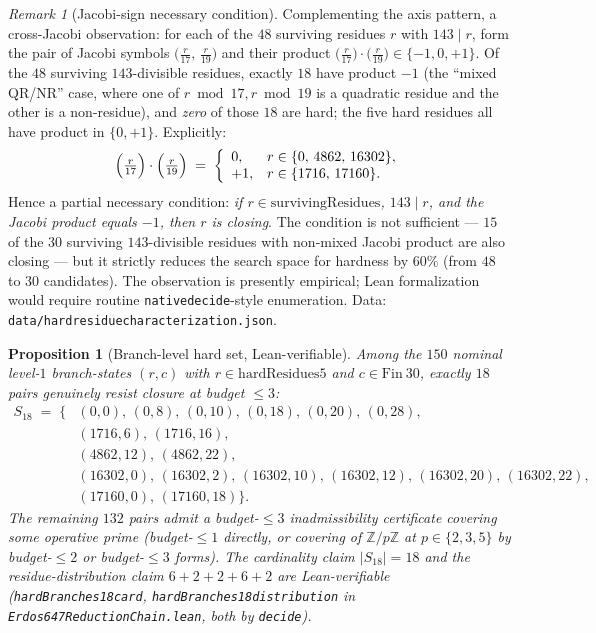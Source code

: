 \documentclass[11pt]{article}
\renewcommand{\_}{\origunderscore\allowbreak}
\newtheorem{proposition}[theorem]{Proposition}
\theoremstyle{definition}
\theoremstyle{remark}
\newtheorem{remark}[theorem]{Remark}
\begin{document}
\begin{remark}[Jacobi-sign necessary condition]\label{rmk:jacobi}
Complementing the axis pattern, a cross-Jacobi observation:
for each of the $48$ surviving residues $r$ with $143\mid r$,
form the pair of Jacobi symbols
$\bigl(\tfrac{r}{17},\,\tfrac{r}{19}\bigr)$ and their product
$\bigl(\tfrac{r}{17}\bigr)\cdot\bigl(\tfrac{r}{19}\bigr)\in\{-1,0,+1\}$.
Of the $48$ surviving $143$-divisible residues, exactly $18$ have
product $-1$ (the ``mixed QR/NR'' case, where one of
$r\bmod 17, r\bmod 19$ is a quadratic residue and the other is a
non-residue), and \emph{zero} of those $18$ are hard; the five hard
residues all have product in $\{0, +1\}$. Explicitly:
\[
\Bigl(\tfrac{r}{17}\Bigr)\cdot\Bigl(\tfrac{r}{19}\Bigr)
\;=\;\left\{
\begin{array}{ll}
0,     & r\in\{0,\,4862,\,16302\},\\
+1,    & r\in\{1716,\,17160\}.
\end{array}
\right.
\]
Hence a partial necessary condition: \emph{if
$r\in\mathrm{survivingResidues}$, $143\mid r$, and the Jacobi
product equals $-1$, then $r$ is closing}. The condition is not
sufficient — $15$ of the $30$ surviving $143$-divisible residues
with non-mixed Jacobi product are also closing — but it strictly
reduces the search space for hardness by $60\%$ (from $48$ to $30$
candidates). The observation is presently empirical; Lean
formalization would require routine \texttt{native\_decide}-style
enumeration. Data: \texttt{data/hard\_residue\_characterization.json}.
\end{remark}

\begin{proposition}[Branch-level hard set, Lean-verifiable]\label{prop:branch18}
Among the $150$ nominal level-$1$ branch-states $(r,c)$ with
$r\in\mathrm{hardResidues5}$ and $c\in\mathrm{Fin}\ 30$, exactly
$18$ pairs genuinely resist closure at budget $\le 3$:
\begin{align*}
S_{18} \;=\; \{&(0,0),\,(0,8),\,(0,10),\,(0,18),\,(0,20),\,(0,28),\\
                &(1716,6),\,(1716,16),\\
                &(4862,12),\,(4862,22),\\
                &(16302,0),\,(16302,2),\,(16302,10),\,(16302,12),\,(16302,20),\,(16302,22),\\
                &(17160,0),\,(17160,18)\}.
\end{align*}
The remaining $132$ pairs admit a budget-$\le 3$ inadmissibility
certificate covering some operative prime (budget-$\le 1$ directly,
or covering of $\mathbb{Z}/p\mathbb{Z}$ at $p\in\{2,3,5\}$ by
budget-$\le 2$ or budget-$\le 3$ forms). The cardinality claim
$|S_{18}| = 18$ and the residue-distribution claim
$6 + 2 + 2 + 6 + 2$ are Lean-verifiable
(\texttt{hardBranches18\_card},
\texttt{hardBranches18\_distribution} in
\texttt{Erdos647ReductionChain.lean}, both by \texttt{decide}).
\end{proposition}
\end{document}
